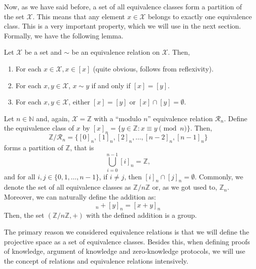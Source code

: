 \documentclass[../lecture-notes-148x210.tex]{subfiles}
\begin{document}
Now, as we have said before, a set of all equivalence classes form a partition of the set $\mathcal{X}$. This means that any element $x \in \mathcal{X}$ belongs to exactly one equivalence class. This is a very important property, which we will use in the next section. Formally, we have the following lemma.
\begin{lemma}
    Let $\mathcal{X}$ be a set and $\sim$ be an equivalence relation on $\mathcal{X}$. Then,
    \begin{enumerate}
        \item For each $x \in \mathcal{X}, x \in [x]$ (quite obvious, follows from reflexivity).
        \item For each $x,y \in \mathcal{X}$, $x \sim y$ if and only if $[x] = [y]$.
        \item For each $x,y \in \mathcal{X}$, either $[x]=[y]$ or $[x] \cap [y] = \emptyset$.
    \end{enumerate}
\end{lemma}

\begin{example}
    Let $n \in \mathbb{N}$ and, again, $\mathcal{X} = \mathbb{Z}$ with a ``modulo $n$'' equivalence relation $\mathcal{R}_n$. Define the equivalence class of $x$ by $[x]_n = \{y \in \mathbb{Z}: x \equiv y \pmod{n}\}$. Then, 
    \begin{equation*}
        \mathbb{Z}/\mathcal{R}_n = \{[0]_n, [1]_n, [2]_n, \dots, [n-2]_n, [n-1]_n\}
    \end{equation*}
    forms a partition of $\mathbb{Z}$, that is 
    \begin{equation*}
        \bigcup_{i=0}^{n-1} [i]_n = \mathbb{Z},
    \end{equation*}
    and for all $i,j \in \{0,1,\dots,n-1\}$, if $i \neq j$, then $[i]_n \cap [j]_n = \emptyset$. Commonly, we denote the set of all equivalence classes as $\mathbb{Z}/n\mathbb{Z}$ or, as we got used to, $\mathbb{Z}_n$. Moreover, we can naturally define the addition as:
    \begin{equation*}
        [x]_n + [y]_n = [x+y]_n
    \end{equation*}
    Then, the set $(\mathbb{Z}/n\mathbb{Z},+)$ with the defined addition is a group.
\end{example}

The primary reason we considered equivalence relations is that we will define the projective space as a set of equivalence classes. Besides this, when defining proofs of knowledge, argument of knowledge and zero-knowledge protocols, we will use the concept of relations and equivalence relations intensively.
\end{document}
